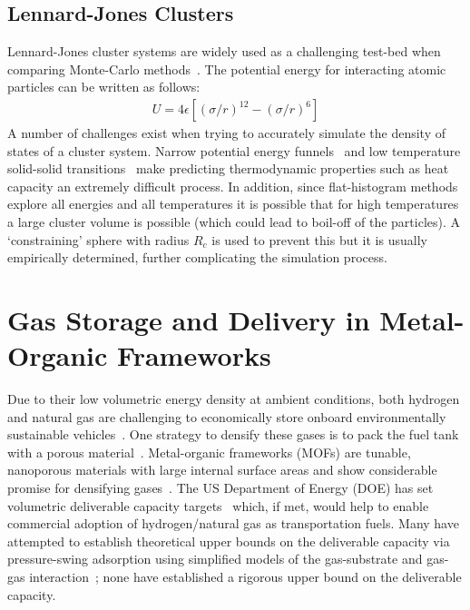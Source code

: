 \subsection{Lennard-Jones Clusters}
Lennard-Jones cluster systems are widely used as a challenging test-bed when comparing Monte-Carlo
methods~\cite{doye1998thermodynamics, poulain2006performances, martiniani2014superposition}. The potential
energy for interacting atomic particles can be written as follows:
\begin{align}
U = 4\epsilon \left[\left( \sigma/r \right)^{12} - \left( \sigma/r \right)^{6}\right]
\end{align}
A number of challenges exist when trying to accurately simulate the density of states of a cluster system.
Narrow potential energy funnels~\cite{mandelshtam2006multiple, wales1997global} and low temperature solid-solid
transitions~\cite{neirotti2000phase, calvo2000phase, calvo2000entropic} make predicting thermodynamic properties
such as heat capacity an extremely difficult process. In addition, since flat-histogram methods explore all
energies and all temperatures it is possible that for high temperatures a large cluster volume is possible
(which could lead to boil-off of the particles). A `constraining' sphere with radius $R_c$ is used to prevent
this but it is usually empirically determined, further complicating the simulation process.

\section{Gas Storage and Delivery in Metal-Organic Frameworks}


Due to their low volumetric energy density at ambient conditions, both hydrogen
and natural gas are challenging to economically store onboard environmentally
sustainable vehicles~\cite{mason2014evaluating, sircar2002pressure}. One
strategy to densify these gases is to pack the fuel tank with a porous
material~\cite{schoedel2016role}. Metal-organic frameworks (MOFs) are tunable, nanoporous
materials with large internal surface areas and show considerable promise for
densifying gases~\cite{makal2012methane,mason2014evaluating,
suh2011hydrogen,garcia2018benchmark, schoedel2016role}. The US Department of
Energy (DOE) has set volumetric deliverable capacity targets~\cite{simon2015materials, h2targetsDOE} which, if met, would help to enable 
commercial adoption of hydrogen/natural gas as
transportation fuels. Many have attempted to establish theoretical upper bounds
on the deliverable capacity via pressure-swing adsorption using simplified
models of the gas-substrate and gas-gas interaction~\cite{gomez2014exploring, 
gomez2017impact, kaija2018high, lee2019predicting}; none have
established a rigorous upper bound on the deliverable capacity.


